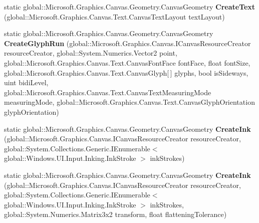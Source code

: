 \begin{DoxyCompactItemize}
\item 
\mbox{\label{class_microsoft_1_1_graphics_1_1_canvas_1_1_geometry_1_1_canvas_geometry_a5c956c37368cb565497e9e95f12918df}} 
static global\+::\+Microsoft.\+Graphics.\+Canvas.\+Geometry.\+Canvas\+Geometry {\bfseries Create\+Text} (global\+::\+Microsoft.\+Graphics.\+Canvas.\+Text.\+Canvas\+Text\+Layout text\+Layout)
\item 
\mbox{\label{class_microsoft_1_1_graphics_1_1_canvas_1_1_geometry_1_1_canvas_geometry_aac0a557b41812921ee04b4413f0fb8f1}} 
static global\+::\+Microsoft.\+Graphics.\+Canvas.\+Geometry.\+Canvas\+Geometry {\bfseries Create\+Glyph\+Run} (global\+::\+Microsoft.\+Graphics.\+Canvas.\+I\+Canvas\+Resource\+Creator resource\+Creator, global\+::\+System.\+Numerics.\+Vector2 point, global\+::\+Microsoft.\+Graphics.\+Canvas.\+Text.\+Canvas\+Font\+Face font\+Face, float font\+Size, global\+::\+Microsoft.\+Graphics.\+Canvas.\+Text.\+Canvas\+Glyph\mbox{[}$\,$\mbox{]} glyphs, bool is\+Sideways, uint bidi\+Level, global\+::\+Microsoft.\+Graphics.\+Canvas.\+Text.\+Canvas\+Text\+Measuring\+Mode measuring\+Mode, global\+::\+Microsoft.\+Graphics.\+Canvas.\+Text.\+Canvas\+Glyph\+Orientation glyph\+Orientation)
\item 
\mbox{\label{class_microsoft_1_1_graphics_1_1_canvas_1_1_geometry_1_1_canvas_geometry_a42466cc94da19392c5dd77f1fd235a67}} 
static global\+::\+Microsoft.\+Graphics.\+Canvas.\+Geometry.\+Canvas\+Geometry {\bfseries Create\+Ink} (global\+::\+Microsoft.\+Graphics.\+Canvas.\+I\+Canvas\+Resource\+Creator resource\+Creator, global\+::\+System.\+Collections.\+Generic.\+I\+Enumerable$<$ global\+::\+Windows.\+U\+I.\+Input.\+Inking.\+Ink\+Stroke $>$ ink\+Strokes)
\item 
\mbox{\label{class_microsoft_1_1_graphics_1_1_canvas_1_1_geometry_1_1_canvas_geometry_a2ab66ac5c29e306f56d21b3368d42415}} 
static global\+::\+Microsoft.\+Graphics.\+Canvas.\+Geometry.\+Canvas\+Geometry {\bfseries Create\+Ink} (global\+::\+Microsoft.\+Graphics.\+Canvas.\+I\+Canvas\+Resource\+Creator resource\+Creator, global\+::\+System.\+Collections.\+Generic.\+I\+Enumerable$<$ global\+::\+Windows.\+U\+I.\+Input.\+Inking.\+Ink\+Stroke $>$ ink\+Strokes, global\+::\+System.\+Numerics.\+Matrix3x2 transform, float flattening\+Tolerance)

\end{DoxyCompactItemize}
